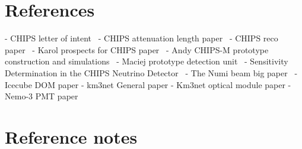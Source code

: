 \section{References}


- CHIPS letter of intent~\cite{adamson2013}
- CHIPS attenuation length paper~\cite{amat2017}
- CHIPS reco paper~\cite{blake2016}
- Karol prospects for CHIPS paper~\cite{lang2015}
- Andy CHIPS-M prototype construction and simulations~\cite{perch2015}
- Maciej prototype detection unit~\cite{pfutznerProto2017}
- Sensitivity Determination in the CHIPS Neutrino Detector~\cite{adde2016}
- The Numi beam big paper~\cite{adamson2016}
- Icecube DOM paper
- km3net General paper
- Km3net optical module paper
- Nemo-3 PMT paper


\section{Reference notes}

